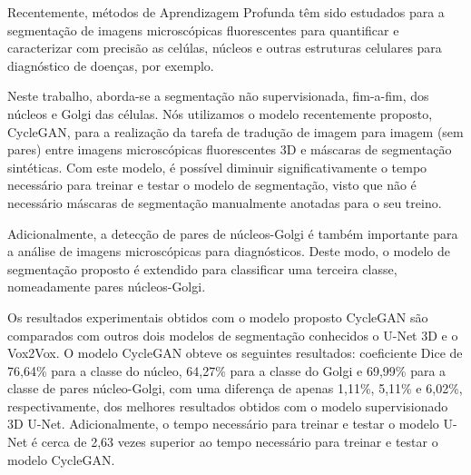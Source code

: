 \acresetall
\noindent Recentemente, métodos de Aprendizagem Profunda têm sido estudados para a segmentação de imagens microscópicas fluorescentes para quantificar e caracterizar com precisão as celúlas, núcleos e outras estruturas celulares para diagnóstico de doenças, por exemplo.

Neste trabalho, aborda-se a segmentação não supervisionada, fim-a-fim, dos núcleos e Golgi das células. Nós utilizamos o modelo recentemente proposto, CycleGAN, para a realização da tarefa de tradução de imagem para imagem (sem pares) entre imagens microscópicas fluorescentes 3D e máscaras de segmentação sintéticas. Com este modelo, é possível diminuir significativamente o tempo necessário para treinar e testar o modelo de segmentação, visto que não é necessário máscaras de segmentação manualmente anotadas para o seu treino.%

Adicionalmente, a detecção de pares de núcleos-Golgi é também importante para a análise de imagens microscópicas para diagnósticos. Deste modo, o modelo de segmentação proposto é extendido para classificar uma terceira classe, nomeadamente pares núcleos-Golgi.

Os resultados experimentais obtidos com o modelo proposto CycleGAN são comparados com outros dois modelos de segmentação conhecidos o U-Net 3D e o Vox2Vox. O modelo CycleGAN obteve os seguintes resultados: coeficiente Dice de 76,64\% para a classe do núcleo, 64,27\% para a classe do Golgi e 69,99\% para a classe de pares núcleo-Golgi, com uma diferença de apenas 1,11\%, 5,11\% e 6,02\%, respectivamente, dos melhores resultados obtidos com o modelo supervisionado 3D U-Net. Adicionalmente, o tempo necessário para treinar e testar o modelo U-Net é cerca de 2,63 vezes superior ao tempo necessário para treinar e testar o modelo CycleGAN.


